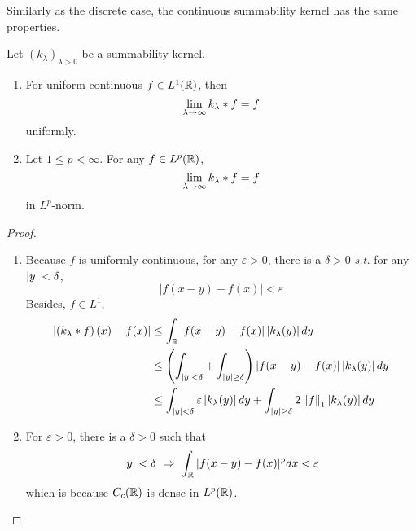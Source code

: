 \begin{enumerate}[label=\arabic*.]
	\noindent Similarly as the discrete case, the continuous summability kernel has the same properties.
	\begin{thm}\label{thm:summability}
		Let $(k_\lambda)_{\lambda > 0}$ be a summability kernel.
		\begin{enumerate}[label=(\arabic{*})]
			\item For uniform continuous $f\in L^1(\mathbb{R})$, then
			\begin{equation*}
				\lim_{\lambda \rightarrow \infty}k_\lambda * f =f
			\end{equation*}
			uniformly.
			\item Let $1 \leq p < \infty$. For any $f \in L^p(\mathbb{R})$,
			\begin{equation*}
			 	\lim_{\lambda \rightarrow \infty}k_\lambda * f =f
			\end{equation*} 
			in $L^p$-norm.
		\end{enumerate}
	\end{thm}
	\begin{proof}
		\begin{enumerate}[label=(\arabic{*})]
			\item Because $f$ is uniformly continuous, for any $\varepsilon > 0$, there is a $\delta > 0$ \emph{s.t.} for any $\left\lvert y\right\lvert < \delta$,
			\begin{equation*}
				|f(x-y)-f(x)|<\varepsilon
			\end{equation*}
			Besides, $f \in L^1$,
			\begin{equation*}
				\begin{aligned}
					\left|\left(k_\lambda * f\right)(x)-f(x)\right| &\leq \int_{\mathbb{R}}|f(x-y)-f(x)|\left|k_\lambda(y)\right| d y  \\
					&\leq \left(\int_{\left\lvert y\right\lvert < \delta}+\int_{\left\lvert y\right\lvert \geq \delta}\right) |f(x-y)-f(x)|\left|k_\lambda(y)\right| d y  \\
					&\leq \int_{\left\lvert y\right\lvert < \delta} \varepsilon \left\lvert k_\lambda(y)\right\lvert dy + \int_{\left\lvert y\right\lvert \geq \delta}2 \left\lVert f\right\lVert_1\left\lvert k_\lambda(y)\right\lvert dy
				\end{aligned}
			\end{equation*}

			\item For $\varepsilon > 0$, there is a $\delta > 0$ such that
			\begin{equation*}
				\left\lvert y\right\lvert < \delta~\Rightarrow~\int_{\mathbb{R}}|f(x-y)-f(x)|^p d x<\varepsilon
			\end{equation*}
			which is because $C_c(\mathbb{R})$ is dense in $L^p(\mathbb{R})$.


\end{enumerate}
\end{proof}
\end{enumerate}
